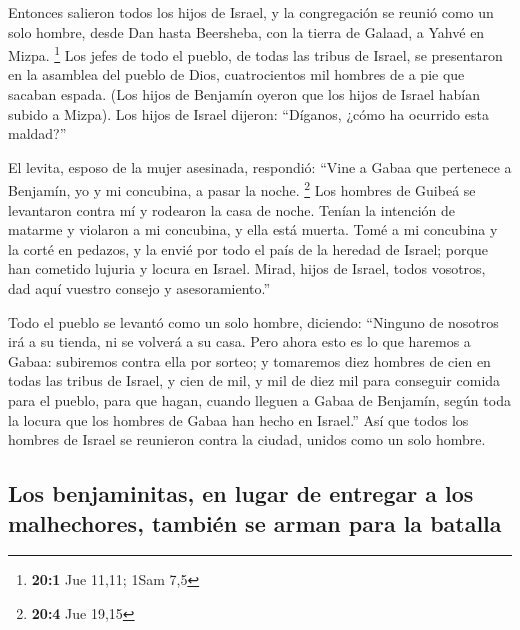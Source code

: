 \begin{paracol}{2}
 Entonces salieron todos los hijos de Israel, y la
congregación se reunió como un solo hombre, desde Dan hasta Beersheba,
con la tierra de Galaad, a Yahvé en Mizpa. \footnote{\textbf{20:1} Jue
  11,11; 1Sam 7,5}  Los jefes de todo el pueblo, de todas
las tribus de Israel, se presentaron en la asamblea del pueblo de Dios,
cuatrocientos mil hombres de a pie que sacaban espada. 
(Los hijos de Benjamín oyeron que los hijos de Israel habían subido a
Mizpa). Los hijos de Israel dijeron: ``Díganos, ¿cómo ha ocurrido esta
maldad?''

 El levita, esposo de la mujer asesinada, respondió:
``Vine a Gabaa que pertenece a Benjamín, yo y mi concubina, a pasar la
noche. \footnote{\textbf{20:4} Jue 19,15}  Los hombres de
Guibeá se levantaron contra mí y rodearon la casa de noche. Tenían la
intención de matarme y violaron a mi concubina, y ella está muerta.
 Tomé a mi concubina y la corté en pedazos, y la envié por
todo el país de la heredad de Israel; porque han cometido lujuria y
locura en Israel.  Mirad, hijos de Israel, todos vosotros,
dad aquí vuestro consejo y asesoramiento.''

 Todo el pueblo se levantó como un solo hombre, diciendo:
``Ninguno de nosotros irá a su tienda, ni se volverá a su casa.
 Pero ahora esto es lo que haremos a Gabaa: subiremos
contra ella por sorteo;  y tomaremos diez hombres de cien
en todas las tribus de Israel, y cien de mil, y mil de diez mil para
conseguir comida para el pueblo, para que hagan, cuando lleguen a Gabaa
de Benjamín, según toda la locura que los hombres de Gabaa han hecho en
Israel.''  Así que todos los hombres de Israel se
reunieron contra la ciudad, unidos como un solo hombre.

\hypertarget{los-benjaminitas-en-lugar-de-entregar-a-los-malhechores-tambiuxe9n-se-arman-para-la-batalla}{%
\subsection{Los benjaminitas, en lugar de entregar a los malhechores,
también se arman para la
batalla}\label{los-benjaminitas-en-lugar-de-entregar-a-los-malhechores-tambiuxe9n-se-arman-para-la-batalla}}


\end{paracol}
